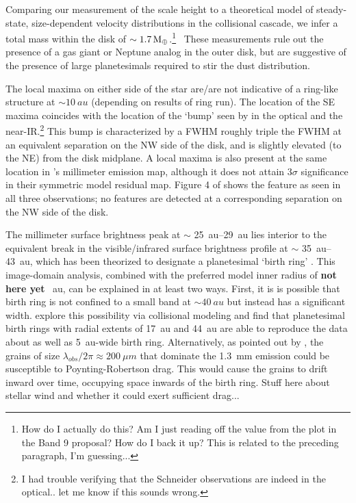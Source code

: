 \documentclass[12pt,oneside]{article}
\begin{document}
Comparing our measurement of the scale height to a theoretical model of steady-state, size-dependent velocity distributions in the collisional cascade, we infer a total mass within the disk of $\sim \SI{1.7}{M_\oplus}$.\footnote{How do I actually do this? Am I just reading off the value from the plot in the Band 9 proposal? How do I back it up? This is related to the preceding paragraph, I'm guessing...} 
These measurements rule out the presence of a gas giant or Neptune analog in the outer disk, but are suggestive of the presence of large planetesimals required to stir the dust distribution.

The local maxima on either side of the star are/are not indicative of a ring-like structure at $\sim \SI{10}{au}$ (depending on results of ring run). 
The location of the SE maxima coincides with the location of the `bump' seen by \cite{schneider14} in the optical and \cite{wang15} the near-IR.\footnote{I had trouble verifying that the Schneider observations are indeed in the optical.. let me know if this sounds wrong.} 
This bump is characterized by a FWHM roughly triple the FWHM at an equivalent separation on the NW side of the disk, and is slightly elevated (to the NE) from the disk midplane. 
A local maxima is also present at the same location in \cite{macgregor13}'s millimeter emission map, although it does not attain $3 \sigma$ significance in their symmetric model residual map.
Figure 4 of \cite{wang15} shows the feature as seen in all three observations; no features are detected at a corresponding separation on the NW side of the disk.

The millimeter surface brightness peak at $\sim$ \SIrange{25}{29}{au} lies interior to the equivalent break in the visible/infrared surface brightness profile at $\sim$ \SIrange{35}{43}{au}, which has been theorized to designate a planetesimal `birth ring' \citep{augereau&beust06,strubbe&chiang06,krist05}. 
This image-domain analysis, combined with the preferred model inner radius of \textbf{not here yet} \SI{}{au}, can be explained in at least two ways.
First, it is is possible that birth ring is not confined to a small band at $\sim \SI{40}{au}$ but instead has a significant width.
\cite{schuppler17} explore this possibility via collisional modeling and find that planetesimal birth rings with radial extents of \SI{17}{au} and \SI{44}{au} are able to reproduce the data about as well as \SI{5}{au}-wide birth ring.
Alternatively, as pointed out by \cite{matthews15}, the grains of size $\lambda_{obs}/2\pi \approx \SI{200}{\mu m}$ that dominate the \SI{1.3}{mm} emission could be susceptible to Poynting-Robertson drag.
This would cause the grains to drift inward over time, occupying space inwards of the birth ring.
Stuff here about stellar wind and whether it could exert sufficient drag...
\end{document}
